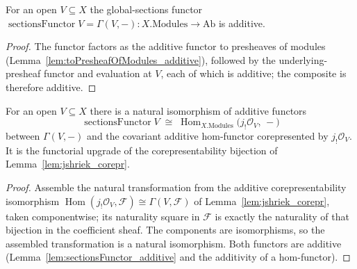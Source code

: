 \begin{lemma}\leanok
  \label{lem:sectionsFunctor_additive}
  For an open \(V \subseteq X\) the global-sections functor
  \(\operatorname{sectionsFunctor} V = \Gamma(V, -) : X.\mathrm{Modules} \to \mathrm{Ab}\) is
  additive.
\end{lemma}
\begin{proof}
  \leanok
  The functor factors as the additive functor to presheaves of modules
  (Lemma~\ref{lem:toPresheafOfModules_additive}), followed by the underlying-presheaf functor and
  evaluation at \(V\), each of which is additive; the composite is therefore additive.
\end{proof}

\begin{lemma}\leanok
  \label{lem:sectionsFunctorCorepIso}
  For an open \(V \subseteq X\) there is a natural isomorphism of additive functors
  \[
    \operatorname{sectionsFunctor} V
      \;\cong\;
    \operatorname{Hom}_{X.\mathrm{Modules}}\bigl(j_!\mathcal{O}_V,\, -\bigr)
  \]
  between \(\Gamma(V, -)\) and the covariant additive hom-functor corepresented by
  \(j_!\mathcal{O}_V\). It is the functorial upgrade of the corepresentability bijection of
  Lemma~\ref{lem:jshriek_corepr}.
\end{lemma}
\begin{proof}
  \leanok
  Assemble the natural transformation from the additive corepresentability isomorphism
  \(\operatorname{Hom}(j_!\mathcal{O}_V, \mathcal{F}) \cong \Gamma(V, \mathcal{F})\) of
  Lemma~\ref{lem:jshriek_corepr}, taken componentwise; its naturality square in \(\mathcal{F}\) is
  exactly the naturality of that bijection in the coefficient sheaf. The components are
  isomorphisms, so the assembled transformation is a natural isomorphism. Both functors are
  additive (Lemma~\ref{lem:sectionsFunctor_additive} and the additivity of a hom-functor).
\end{proof}

